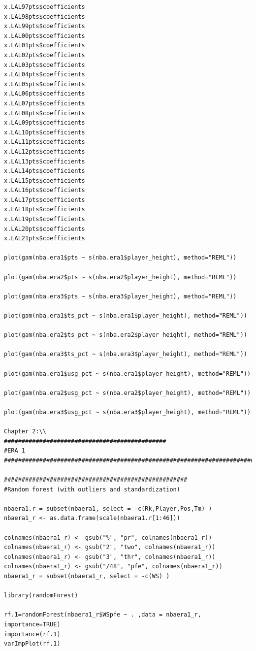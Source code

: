 \documentclass[11pt,letterpaper]{amsart}
\begin{document}
\begin{lstlisting}[breaklines]
x.LAL97pts$coefficients
x.LAL98pts$coefficients
x.LAL99pts$coefficients
x.LAL00pts$coefficients
x.LAL01pts$coefficients
x.LAL02pts$coefficients
x.LAL03pts$coefficients
x.LAL04pts$coefficients
x.LAL05pts$coefficients
x.LAL06pts$coefficients
x.LAL07pts$coefficients
x.LAL08pts$coefficients
x.LAL09pts$coefficients
x.LAL10pts$coefficients
x.LAL11pts$coefficients
x.LAL12pts$coefficients
x.LAL13pts$coefficients
x.LAL14pts$coefficients
x.LAL15pts$coefficients
x.LAL16pts$coefficients
x.LAL17pts$coefficients
x.LAL18pts$coefficients
x.LAL19pts$coefficients
x.LAL20pts$coefficients
x.LAL21pts$coefficients

plot(gam(nba.era1$pts ~ s(nba.era1$player_height), method="REML"))

plot(gam(nba.era2$pts ~ s(nba.era2$player_height), method="REML"))

plot(gam(nba.era3$pts ~ s(nba.era3$player_height), method="REML"))

plot(gam(nba.era1$ts_pct ~ s(nba.era1$player_height), method="REML"))

plot(gam(nba.era2$ts_pct ~ s(nba.era2$player_height), method="REML"))

plot(gam(nba.era3$ts_pct ~ s(nba.era3$player_height), method="REML"))

plot(gam(nba.era1$usg_pct ~ s(nba.era1$player_height), method="REML"))

plot(gam(nba.era2$usg_pct ~ s(nba.era2$player_height), method="REML"))

plot(gam(nba.era3$usg_pct ~ s(nba.era3$player_height), method="REML"))

Chapter 2:\\
##############################################
#ERA 1
############################################################################

####################################################
#Random forest (with outliers and standardization)

nbaera1.r = subset(nbaera1, select = -c(Rk,Player,Pos,Tm) )
nbaera1_r <- as.data.frame(scale(nbaera1.r[1:46]))

colnames(nbaera1_r) <- gsub("%", "pr", colnames(nbaera1_r))
colnames(nbaera1_r) <- gsub("2", "two", colnames(nbaera1_r))
colnames(nbaera1_r) <- gsub("3", "thr", colnames(nbaera1_r))
colnames(nbaera1_r) <- gsub("/48", "pfe", colnames(nbaera1_r))
nbaera1_r = subset(nbaera1_r, select = -c(WS) )

library(randomForest)

rf.1=randomForest(nbaera1_r$WSpfe ~ . ,data = nbaera1_r, importance=TRUE)
importance(rf.1)
varImpPlot(rf.1)


\end{lstlisting}
\end{document}
